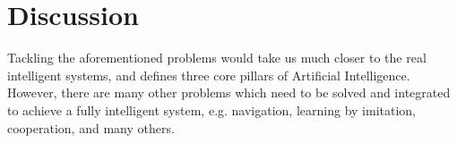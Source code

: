 \documentclass{article}
\begin{document}
\section{Discussion}
Tackling the aforementioned problems would take us much closer to the
real intelligent systems, and defines three core pillars 
of Artificial Intelligence. However, there are many other problems which 
need to be solved and integrated to achieve a fully 
intelligent system, e.g. navigation, learning by imitation, cooperation, and many others.









\end{document}
